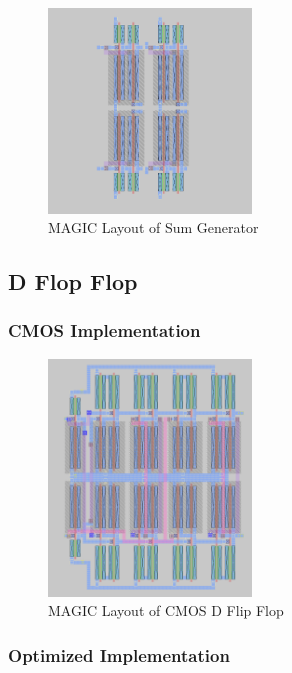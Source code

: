 \documentclass[conference]{IEEEtran}
\begin{document}
\begin{figure}[H]
    \centering
    \includegraphics[width=0.48\textwidth]{images/sum_gen_optimized_layout.png}
    \caption{MAGIC Layout of Sum Generator}
\end{figure}

\subsection{D Flop Flop}

\subsubsection{CMOS Implementation}

\begin{figure}[H]
    \centering
    \includegraphics[width=0.48\textwidth]{images/d_ff_cmos_layout.png}
    \caption{MAGIC Layout of CMOS D Flip Flop}
\end{figure}

\subsubsection{Optimized Implementation}
\end{document}

